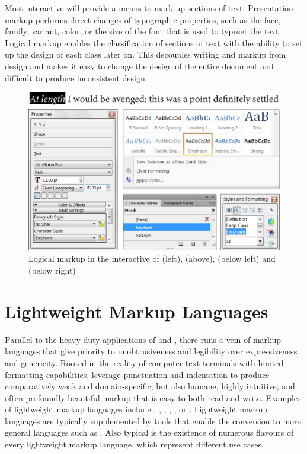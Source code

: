 \documentclass[a5paper,10pt]{book}
\begin{document}
Most interactive  will provide a means to mark up sections of text.
Presentation markup performs direct changes of typographic properties, such as
the face, family, variant, color, or the size of the font that is used to
typeset the text. Logical markup enables the classification of sections of text
with the ability to set up the design of each class later on. This decouples
writing and markup from design and makes it easy to change the design of the
entire document and difficult to produce inconsistent design.

\begin{figure}
  \includegraphics[width=\textwidth]{examples/02/interactive-editors.png}
  \caption{Logical markup in the interactive  of 
    (left),  (above),  (below left) and
     (below right)}
\end{figure}

\section{Lightweight Markup Languages}
Parallel to the heavy-duty applications of  and ,
there runs a vein of markup languages that give priority to unobtrusiveness and
legibility over expressiveness and genericity. Rooted in the reality of
computer text terminals with limited formatting capabilities,  leverage punctuation and
indentation to produce comparatively weak and domain-specific, but also humane,
highly intuitive, and often profoundly beautiful markup that is easy to both
read and write. Examples of lightweight markup languages include ,
, , , , or .
Lightweight markup languages are typically supplemented by tools that enable
the conversion to more general languages such as . Also typical
is the existence of numerous flavours of every lightweight markup language,
which represent different use cases.
\end{document}
